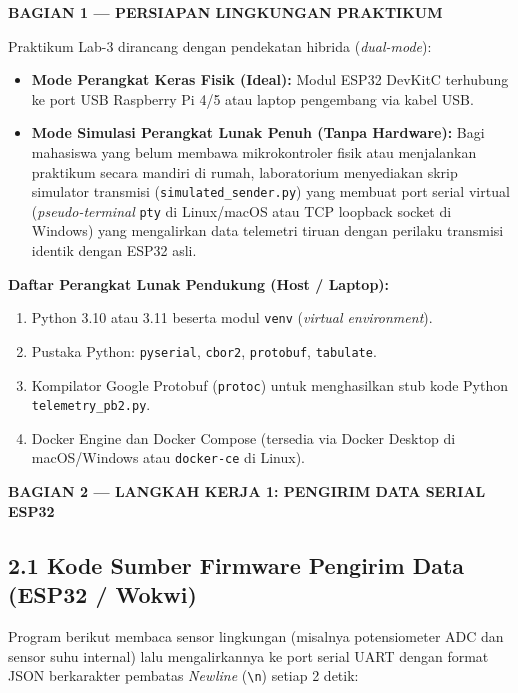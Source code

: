 \documentclass[11pt,a4paper]{article}
\newcommand{\secbanner}[2]{%
    \vspace{8pt}%
    \noindent\colorbox{unibnavy}{%
        \parbox{\dimexpr\textwidth-2\fboxsep\relax}{%
            \vspace{4pt}\textbf{\large\color{white}#1 --- #2}\vspace{4pt}%
        }%
    }%
    \vspace{4pt}%
}
\begin{document}
\secbanner{BAGIAN 1}{PERSIAPAN LINGKUNGAN PRAKTIKUM}

Praktikum Lab-3 dirancang dengan pendekatan hibrida (\textit{dual-mode}):
\begin{itemize}
    \item \textbf{Mode Perangkat Keras Fisik (Ideal):} Modul ESP32 DevKitC terhubung ke port USB Raspberry Pi 4/5 atau laptop pengembang via kabel USB.
    \item \textbf{Mode Simulasi Perangkat Lunak Penuh (Tanpa Hardware):} Bagi mahasiswa yang belum membawa mikrokontroler fisik atau menjalankan praktikum secara mandiri di rumah, laboratorium menyediakan skrip simulator transmisi (\texttt{simulated\_sender.py}) yang membuat port serial virtual (\textit{pseudo-terminal} \texttt{pty} di Linux/macOS atau TCP loopback socket di Windows) yang mengalirkan data telemetri tiruan dengan perilaku transmisi identik dengan ESP32 asli.
\end{itemize}

\textbf{Daftar Perangkat Lunak Pendukung (Host / Laptop):}
\begin{enumerate}
    \item Python 3.10 atau 3.11 beserta modul \texttt{venv} (\textit{virtual environment}).
    \item Pustaka Python: \texttt{pyserial}, \texttt{cbor2}, \texttt{protobuf}, \texttt{tabulate}.
    \item Kompilator Google Protobuf (\texttt{protoc}) untuk menghasilkan stub kode Python \texttt{telemetry\_pb2.py}.
    \item Docker Engine dan Docker Compose (tersedia via Docker Desktop di macOS/Windows atau \texttt{docker-ce} di Linux).
\end{enumerate}

\secbanner{BAGIAN 2}{LANGKAH KERJA 1: PENGIRIM DATA SERIAL ESP32}

\subsection*{2.1 Kode Sumber Firmware Pengirim Data (ESP32 / Wokwi)}
Program berikut membaca sensor lingkungan (misalnya potensiometer ADC dan sensor suhu internal) lalu mengalirkannya ke port serial UART dengan format JSON berkarakter pembatas \textit{Newline} (\texttt{\textbackslash n}) setiap 2 detik:
\end{document}
